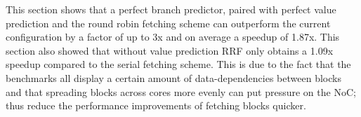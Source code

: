 This section shows that a perfect branch predictor, paired with perfect value prediction and the round robin fetching scheme can outperform the current configuration by a factor of up to 3x and on average a speedup of 1.87x.%
This section also showed that without value prediction RRF only obtains a 1.09x speedup compared to the serial fetching scheme.
This is due to the fact that the benchmarks all display a certain amount of data-dependencies between blocks and that spreading blocks across cores more evenly can put pressure on the NoC; thus reduce the performance improvements of fetching blocks quicker.

